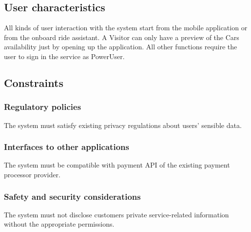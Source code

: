 \subsection{User characteristics}
All kinds of user interaction with the system start from the mobile application or from the onboard ride assistant. A Visitor can only have a preview of the Cars availability just by opening up the application. All other functions require the user to sign in the service as PowerUser.

\subsection{Constraints}
\subsubsection{Regulatory policies}
The system must satisfy existing privacy regulations about users' sensible data.
\subsubsection{Interfaces to other applications}
The system must be compatible with payment API of the existing payment processor provider.
\subsubsection{Safety and security considerations}
The system must not disclose customers private service-related information without the appropriate permissions.

